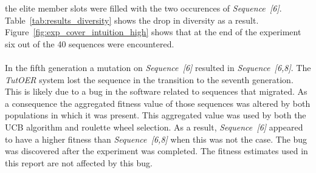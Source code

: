 the elite member slots were filled with the two occurences of
\emph{Sequence~[6]}. Table~\ref{tab:results_diversity} shows the drop in
diversity as a result. Figure~\ref{fig:exp_cover_intuition_high} shows that at
the end of the experiment six out of the 40 sequences were encountered.\\\\
\noindent
In the fifth generation a mutation on \emph{Sequence~[6]} resulted in
\emph{Sequence~[6,8]}. The \emph{TutOER} system lost the sequence in the
transition to the seventh generation. This is likely due to a bug in the
software related to sequences that migrated. As a consequence the aggregated
fitness value of those sequences was altered by both populations in which it
was present. This aggregated value was used by both the UCB algorithm and
roulette wheel selection. As a result, \emph{Sequence~[6]} appeared to have a
higher fitness than \emph{Sequence~[6,8]} when this was not the case. The bug
was discovered after the experiment was completed. The fitness estimates used
in this report are not affected by this bug.
